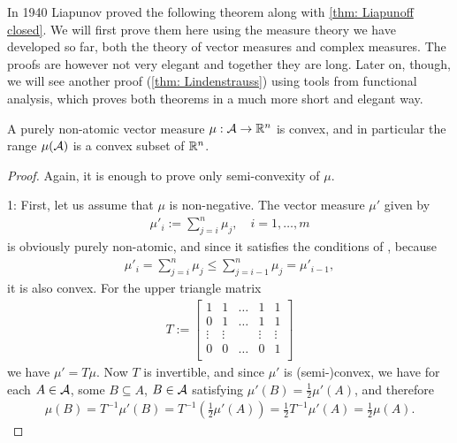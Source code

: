 In 1940 Liapunov proved the following theorem along with \cref{thm: Liapunoff closed}. We will first prove them here using the measure theory we have developed so far, both the theory of vector measures and complex measures. The proofs are however not very elegant and together they are long. Later on, though, we will see another proof (\cref{thm: Lindenstrauss}) using tools from functional analysis, which proves both theorems in a much more short and elegant way.

\begin{theorem}[Lyapunov, 1940]\label{thm: Liapunoff convex}
A purely non-atomic vector measure $\mu: \mathcal{A} \to \mathbb{R}^{n}$ is convex, and in particular the range $\mu(\mathcal{A})$ is a convex subset of $\mathbb{R}^{n}$.
\end{theorem}
\begin{proof}
Again, it is enough to prove only semi-convexity of $\mu$.

1: First, let us assume that $\mu$ is non-negative. The vector measure $\mu'$ given by
\begin{align*}
	\mu'_{i}:=\sum_{j=i}^{n}\mu_{j}, \quad i=1, \dots, m
\end{align*}
is obviously purely non-atomic, and since it satisfies the conditions of , because
\begin{align*}
	\mu'_{i}=\sum_{j=i}^{n}\mu_{j} \le \sum_{j=i-1}^{n}\mu_{j} = \mu'_{i-1},
\end{align*}
it is also convex. For the upper triangle matrix
\begin{align*}
	T:=\begin{bmatrix}
	1 & 1 & \dots & 1 & 1 \\
	0 & 1 & \dots & 1 & 1 \\
	\vdots & \vdots &  & \vdots & \vdots \\
	0 & 0 & \dots & 0 & 1 \\
	\end{bmatrix}
\end{align*}
we have $\mu'=T\mu$. Now $T$ is invertible, and since $\mu'$ is (semi-)convex, we have for each $A\in \mathcal{A}$, some $B\subseteq A$, $B\in \mathcal{A}$ satisfying $\mu'(B)=\frac{1}{2}\mu'(A)$, and therefore
\begin{align*}
	\mu(B)=T^{-1}\mu'(B)=T^{-1}\left(\frac{1}{2}\mu'(A)\right) = \frac{1}{2}T^{-1}\mu'(A)=\frac{1}{2}\mu(A).
\end{align*}


\end{proof}
